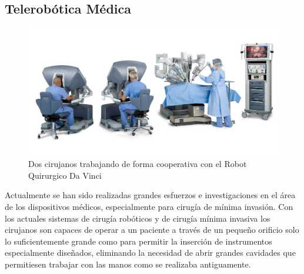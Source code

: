 









\subsection{Telerobótica Médica}


\begin{figure}[htp!]
\centering
\includegraphics[scale=0.65]{FiguresSoA/News-Da-Vinci-Surgical-Robot-4}
\caption[dos cirujanos ]{Dos cirujanos trabajando de forma cooperativa con el Robot Quirurgico Da Vinci}
\label{fig:davinci1}
\end{figure}


Actualmente se han sido realizadas  grandes esfuerzos e investigaciones en el área de los dispositivos médicos, especialmente para cirugía de mínima invasión. Con los actuales sistemas de cirugía robóticos y de cirugía mínima invasiva los cirujanos son capaces de operar a un paciente a través de un pequeño orificio solo lo suficientemente grande como para permitir la inserción de instrumentos especialmente diseñados, eliminando la necesidad de abrir grandes cavidades que permitiesen trabajar con las manos como se realizaba antiguamente.\\


